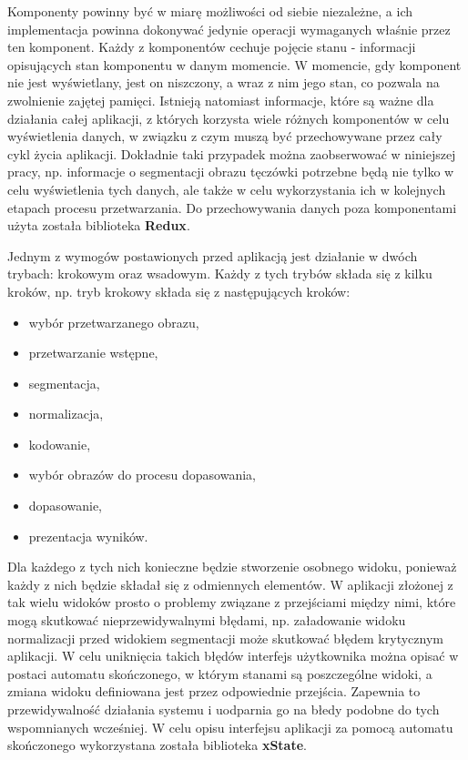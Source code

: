 Komponenty powinny by\'c w miarę możliwości od siebie niezależne, a ich implementacja powinna
dokonywa\'c jedynie operacji wymaganych właśnie przez ten komponent. Każdy z komponentów cechuje
pojęcie stanu - informacji opisujących stan komponentu w danym momencie. W momencie, gdy komponent
nie jest wyświetlany, jest on niszczony, a wraz z nim jego stan, co pozwala na zwolnienie
zajętej pamięci. Istnieją natomiast informacje, które są ważne dla działania całej aplikacji, z których
korzysta wiele różnych komponentów w celu wyświetlenia danych, w związku z czym muszą by\'c przechowywane
przez cały cykl życia aplikacji. Dokładnie taki przypadek można zaobserwowa\'c w niniejszej pracy, np.
informacje o segmentacji obrazu tęczówki potrzebne będą nie tylko w celu wyświetlenia tych danych,
ale także w celu wykorzystania ich w kolejnych etapach procesu przetwarzania. Do przechowywania danych
poza komponentami użyta została biblioteka \textbf{Redux}.

Jednym z wymogów postawionych przed aplikacją jest działanie w dwóch trybach: krokowym oraz wsadowym.
Każdy z tych trybów składa się z kilku kroków, np. tryb krokowy składa się z następujących kroków:

\begin{itemize}
  \item wybór przetwarzanego obrazu,
  \item przetwarzanie wstępne,
  \item segmentacja,
  \item normalizacja,
  \item kodowanie,
  \item wybór obrazów do procesu dopasowania,
  \item dopasowanie,
  \item prezentacja wyników.
\end{itemize}

Dla każdego z tych nich konieczne będzie stworzenie osobnego widoku, ponieważ każdy z nich będzie składał
się z odmiennych elementów. W aplikacji złożonej z tak wielu widoków prosto o problemy związane z przejściami między nimi,
które mogą skutkowa\'c nieprzewidywalnymi błędami, np. załadowanie widoku normalizacji przed widokiem segmentacji
może skutkowa\'c błędem krytycznym aplikacji. W celu uniknięcia takich błędów interfejs użytkownika można
opisa\'c w postaci automatu skończonego, w którym stanami są poszczególne widoki, a zmiana widoku definiowana
jest przez odpowiednie przejścia. Zapewnia to przewidywalnoś\'c działania systemu i uodparnia go na
błedy podobne do tych wspomnianych wcześniej. W celu opisu interfejsu aplikacji za pomocą automatu skończonego
wykorzystana została biblioteka \textbf{xState}.\newline

